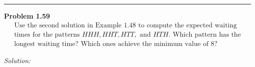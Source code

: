 \documentclass[a4paper, 11pt]{article}
\newenvironment{problem}[2][Problem]
    { \begin{mdframed}[backgroundcolor=gray!20] \textbf{#1 #2} \\}
    {  \end{mdframed}}
\newenvironment{solution}
    {\textit{Solution:}}
    {}
\begin{document}
\noindent\rule{7in}{2.8pt}
\begin{problem}{1.59}
  \begin{equation*}
  \begin{array}{l}\text { Use the second solution in Example } 1.48 \text { to compute the expected waiting } \\ \text { times for the patterns } H H H, H H T, H T T, \text { and } H T H . \text { Which pattern has the } \\ \text { longest waiting time? Which ones achieve the minimum value of } 8 ?\end{array}
  \end{equation*}
\end{problem}

\begin{solution}
  
\end{solution}
\end{document}
